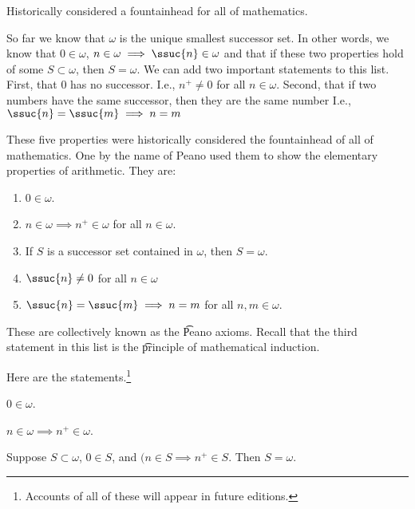 

Historically considered a fountainhead for all of mathematics.


So far we know that $\omega$ is the unique smallest successor set.
In other words, we know that $0 \in \omega$, $n \in \omega \implies \ssuc{n} \in \omega$ and that if these two properties hold of some $S \subset \omega$, then $S = \omega$.
We can add two important statements to this list.
First, that 0 has no successor.
I.e., $n^+ \neq 0$ for all $n \in \omega$.
Second, that if two numbers have the same successor, then they are the same number
I.e., $\ssuc{n} = \ssuc{m} \implies n = m$

These five properties were historically considered the fountainhead of all of mathematics.
One by the name of Peano used them to show the elementary properties of arithmetic.
They are:

\begin{enumerate}
  \item $0 \in \omega$.
  \item $n \in \omega \implies n^+ \in \omega$ for all $n \in \omega$.
  \item If $S$ is a successor set contained in $\omega$, then $S = \omega$.
  \item $\ssuc{n} \neq 0$ for all $n \in \omega$
  \item $\ssuc{n} = \ssuc{m} \implies n = m$ for all $n, m \in \omega$.
\end{enumerate}

These are collectively known as the \t{Peano axioms}.
Recall that the third statement in this list is the \t{principle of mathematical induction}.


Here are the statements.\footnote{Accounts of all of these will appear in future editions.}

\begin{proposition}
  $0 \in \omega$.
\end{proposition}

\begin{proposition}
  $n \in \omega \implies n^+ \in \omega$.
\end{proposition}

\begin{proposition}
  Suppose $S \subset \omega$, $0 \in S$, and $(n \in S \implies n^+ \in S$.
  Then $S = \omega$.
\end{proposition}

